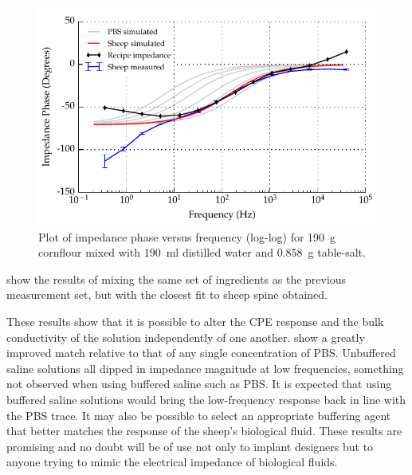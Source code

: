   \begin{figure}
      \centering
      \includegraphics[width=\textwidth]{content/pt2/graphics/run12_190ml-distilledWater_190g-cornflour_0g858-salt_ZVsF_graph_phase}
      \caption{\label{fig:recipe_cornflour_salt_extraWater_phase_improved}Plot of impedance phase versus frequency (log-log) for \SI{190}{\gram} cornflour mixed with \SI{190}{\milli\litre} distilled water and \SI{0.858}{\gram} table-salt.}
  \end{figure}
  
   show the results of mixing the same set of ingredients as the previous measurement set, but with the closest fit to sheep spine obtained.
  


  
  These results show that it is possible to alter the CPE response and the bulk conductivity of the solution independently of one another.
   show a greatly improved match relative to that of any single concentration of PBS.
  Unbuffered saline solutions all dipped in impedance magnitude at low frequencies, something not observed when using buffered saline such as PBS.
  It is expected that using buffered saline solutions would bring the low-frequency response back in line with the PBS trace.
  It may also be possible to select an appropriate buffering agent that better matches the response of the sheep's biological fluid.
  These results are promising and no doubt will be of use not only to implant designers but to anyone trying to mimic the electrical impedance of biological fluids.
